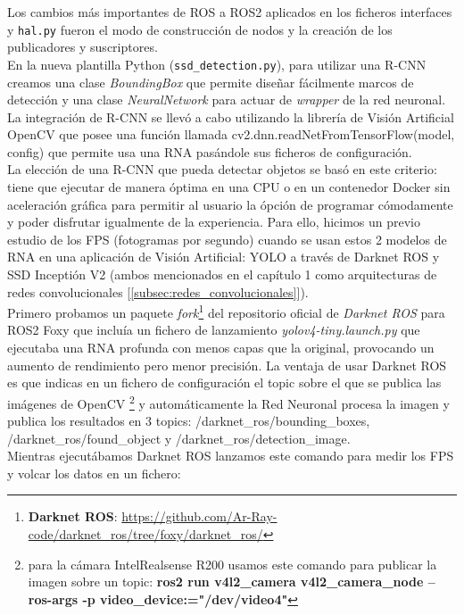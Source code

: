 Los cambios más importantes de ROS a ROS2 aplicados en los ficheros interfaces y \texttt{hal.py} fueron el modo de construcción de nodos y la creación de los publicadores y suscriptores.\\

En la nueva plantilla Python (\texttt{ssd\_detection.py}), para utilizar una R-CNN creamos una clase \textit{BoundingBox} que permite diseñar fácilmente marcos de detección y una clase \textit{NeuralNetwork} para actuar de \textit{wrapper} de la red neuronal. La integración de R-CNN se llevó a cabo utilizando la librería de Visión Artificial OpenCV que posee una función llamada cv2.dnn.readNetFromTensorFlow(model, config) que permite usa una RNA pasándole sus ficheros de configuración.\\

La elección de una R-CNN que pueda detectar objetos se basó en este criterio: tiene que ejecutar de manera óptima en una CPU o en un contenedor Docker sin aceleración gráfica para permitir al usuario la ópción de programar cómodamente y poder disfrutar igualmente de la experiencia. Para ello, hicimos un previo estudio de los FPS (fotogramas por segundo) cuando se usan estos 2 modelos de RNA en una aplicación de Visión Artificial: YOLO a través de Darknet ROS y SSD Inceptión V2 (ambos mencionados en el capítulo 1 como arquitecturas de redes convolucionales [\ref{subsec:redes_convolucionales}]).\\

Primero probamos un paquete \textit{fork}\footnote{\textbf{Darknet ROS}: \url{https://github.com/Ar-Ray-code/darknet_ros/tree/foxy/darknet_ros/}} del repositorio oficial de \textit{Darknet ROS} para ROS2 Foxy que incluía un fichero de lanzamiento \textit{yolov4-tiny.launch.py} que ejecutaba una RNA profunda con menos capas que la original, provocando un aumento de rendimiento pero menor precisión. La ventaja de usar Darknet ROS es que indicas en un fichero de configuración el topic sobre el que se publica las imágenes de OpenCV \footnote{para la cámara IntelRealsense R200 usamos este comando para publicar la imagen sobre un topic: \textbf{ros2 run v4l2\_camera v4l2\_camera\_node --ros-args -p video\_device:="/dev/video4"}} y automáticamente la Red Neuronal procesa la imagen y publica los resultados en 3 topics: /darknet\_ros/bounding\_boxes, /darknet\_ros/found\_object y /darknet\_ros/detection\_image.\\

Mientras ejecutábamos Darknet ROS lanzamos este comando para medir los FPS y volcar los datos en un fichero:\\

